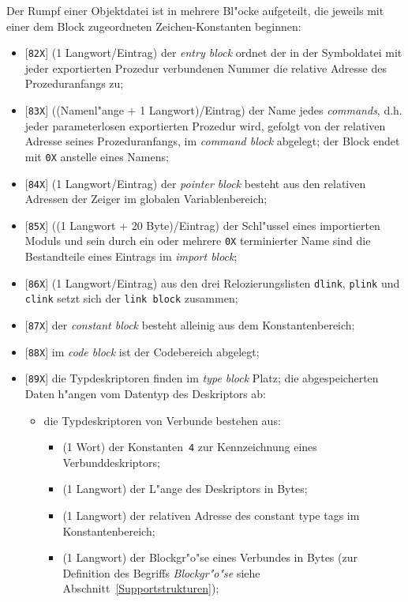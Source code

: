 Der Rumpf einer Objektdatei ist in mehrere Bl"ocke aufgeteilt,
die jeweils mit einer dem Block zugeordneten Zeichen-Konstanten beginnen:
\begin{itemize}
\item {}[{\tt 82X}] (1 Langwort/Eintrag) der {\it entry block\/} ordnet der in
  der Symboldatei mit jeder exportierten Prozedur verbundenen Nummer die
  relative Adresse des Prozeduranfangs zu;
\item {}[{\tt 83X}] ((Namenl"ange + 1 Langwort)/Eintrag) der Name jedes {\it commands},
  d.h. jeder parameterlosen exportierten Prozedur wird, gefolgt von der
  relativen Adresse seines Prozeduranfangs, im {\it command block} abgelegt;
  der Block endet mit {\tt 0X} anstelle eines Namens;
\item {}[{\tt 84X}] (1 Langwort/Eintrag) der {\it pointer block\/} besteht aus
  den relativen Adressen der Zeiger im globalen Variablenbereich;
\item {}[{\tt 85X}] ((1 Langwort + 20 Byte)/Eintrag) der Schl"ussel eines importierten
  Moduls und sein durch ein oder mehrere {\tt 0X} terminierter Name sind die
  Bestandteile eines Eintrags im {\it import block};
\item {}[{\tt 86X}] (1 Langwort/Eintrag) aus den drei Relozierungslisten
  {\tt dlink}, {\tt plink} und {\tt clink} setzt sich der {\tt link block\/}
  zusammen;
\item {}[{\tt 87X}] der {\it constant block\/} besteht alleinig aus dem
  Konstantenbereich;
\item {}[{\tt 88X}] im {\it code block\/} ist der Codebereich abgelegt;
\item {}[{\tt 89X}] die Typdeskriptoren finden im {\it type block\/} Platz;
  die abgespeicherten Daten h"angen vom Datentyp des Deskriptors ab:
  \begin{itemize}
  \item die Typdeskriptoren von Verbunde bestehen aus:
    \begin{itemize}
      \item (1 Wort) der Konstanten~{\tt 4} zur Kennzeichnung eines Verbunddeskriptors;
      \item (1 Langwort) der L"ange des Deskriptors in Bytes;
      \item (1 Langwort) der relativen Adresse des constant type tags im
        Konstantenbereich;
      \item (1 Langwort) der Blockgr"o"se eines Verbundes in Bytes (zur Definition des
        Begriffs {\it Blockgr"o"se\/} siehe Abschnitt~\ref{Supportstrukturen});

\end{itemize}
\end{itemize}
\end{itemize}
